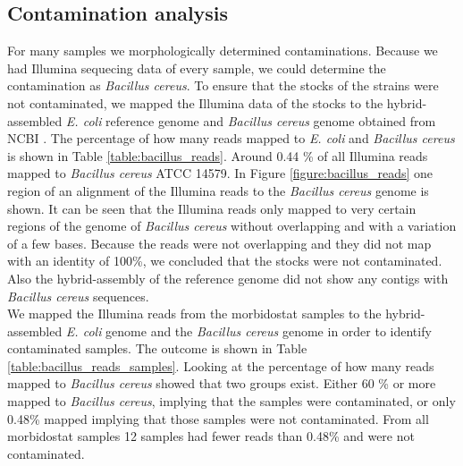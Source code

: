\subsection{Contamination analysis}
For many samples we morphologically determined contaminations. Because we had Illumina sequecing data of every sample, we could determine the contamination as \textit{Bacillus cereus}. To ensure that the stocks of the strains were not contaminated, we mapped the Illumina data of the stocks to the hybrid-assembled \textit{E. coli} reference genome and \textit{Bacillus cereus} genome obtained from NCBI \cite{noauthor_bacillus_nodate}. The percentage of how many reads mapped to \textit{E. coli} and \textit{Bacillus cereus} is shown in Table \ref{table:bacillus_reads}. Around 0.44 \% of all Illumina reads mapped to \textit{Bacillus cereus} ATCC 14579. In Figure \ref{figure:bacillus_reads} one region of an alignment of the Illumina reads to the \textit{Bacillus cereus} genome is shown. It can be seen that the Illumina reads only mapped to very certain regions of the genome of \textit{Bacillus cereus} without overlapping and with a variation of a few bases. Because the reads were not overlapping and they did not map with an identity of 100\%, we concluded that the stocks were not contaminated. Also the hybrid-assembly of the reference genome did not show any contigs with \textit{Bacillus cereus} sequences. \\
We mapped the Illumina reads from the morbidostat samples to the hybrid-assembled \textit{E. coli} genome and the \textit{Bacillus cereus} genome in order to identify contaminated samples. The outcome is shown in Table \ref{table:bacillus_reads_samples}. Looking at the percentage of how many reads mapped to \textit{Bacillus cereus} showed that two groups exist. Either 60 \% or more mapped to \textit{Bacillus cereus}, implying that the samples were contaminated, or only 0.48\% mapped implying that those samples were not contaminated. From all morbidostat samples 12 samples had fewer reads than 0.48\% and were not contaminated.
